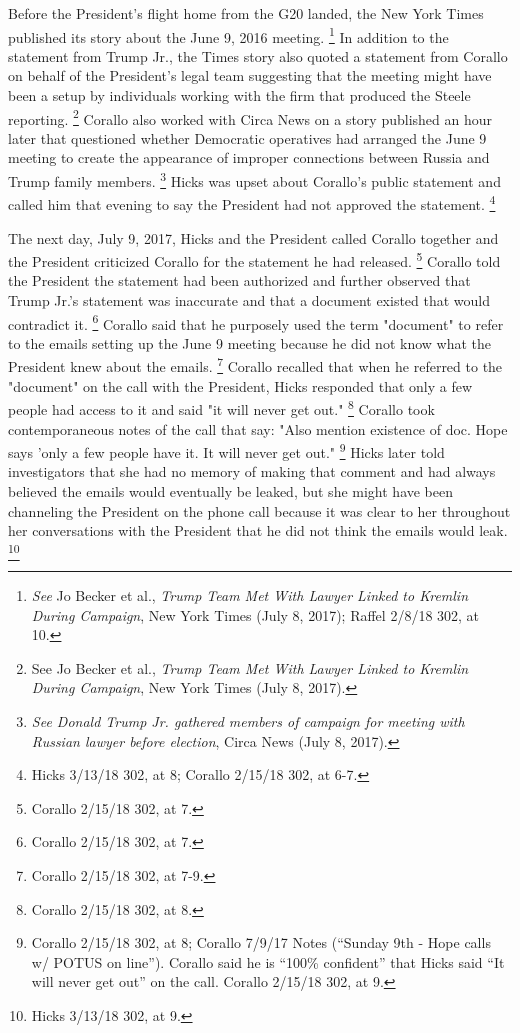 {Before the President's flight home from the G20 landed, the New York Times published its story about the June 9, 2016 meeting.%
\footnote{\textit{See} Jo Becker et al., \textit{Trump Team Met With Lawyer Linked to Kremlin During Campaign}, New York Times (July 8, 2017);
Raffel 2/8/18 302, at 10.}
In addition to the statement from Trump Jr., the Times story also quoted a statement from Corallo on behalf of the President's legal team suggesting that the meeting might have been a setup by individuals working with the firm that produced the Steele reporting.%
\footnote{See Jo Becker et al., \textit{Trump Team Met With Lawyer Linked to Kremlin During Campaign}, New York Times (July 8, 2017).}
Corallo also worked with Circa News on a story published an hour later that questioned whether Democratic operatives had arranged the June 9 meeting to create the appearance of improper connections between Russia and Trump family members.%
\footnote{\textit{See Donald Trump Jr. gathered members of campaign for meeting with Russian lawyer before election}, Circa News (July 8, 2017).}
Hicks was upset about Corallo's public statement and called him that evening to say the President had not approved the statement.%
\footnote{Hicks 3/13/18 302, at 8;
Corallo 2/15/18 302, at 6-7.}

The next day, July 9, 2017, Hicks and the President called Corallo together and the President criticized Corallo for the statement he had released.%
\footnote{Corallo 2/15/18 302, at 7.}
Corallo told the President the statement had been authorized and further observed that Trump Jr.'s statement was inaccurate and that a document existed that would contradict it.%
\footnote{Corallo 2/15/18 302, at 7.}
Corallo said that he purposely used the term "document" to refer to the emails setting up the June 9 meeting because he did not know what the President knew about the emails.%
\footnote{Corallo 2/15/18 302, at 7-9.}
Corallo recalled that when he referred to the "document" on the call with the President, Hicks responded that only a few people had access to it and said "it will never get out."%
\footnote{Corallo 2/15/18 302, at 8.}
Corallo took contemporaneous notes of the call that say:
"Also mention existence of doc.
Hope says 'only a few people have it.
It will never get out."%
\footnote{Corallo 2/15/18 302, at 8;
Corallo 7/9/17 Notes (“Sunday 9th - Hope calls w/ POTUS on line”).
Corallo said he is “100\% confident” that Hicks said “It will never get out” on the call.
Corallo 2/15/18 302, at 9.}
Hicks later told investigators that she had no memory of making that comment and had always believed the emails would eventually be leaked, but she might have been channeling the President on the phone call because it was clear to her throughout her conversations with the President that he did not think the emails would leak.%
\footnote{Hicks 3/13/18 302, at 9.}

}
